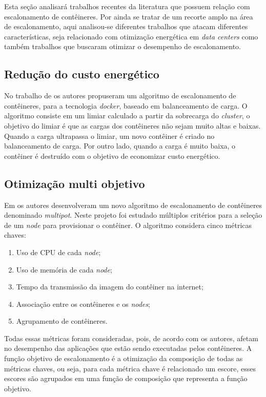 Esta seção analisará trabalhos recentes da literatura que possuem relação com escalonamento de contêineres. Por ainda se tratar de um recorte amplo na área de escalonamento, aqui analisou-se diferentes trabalhos que atacam diferentes características, seja relacionado com otimização energética em \textit{data centers} como também trabalhos que buscaram otimizar o desempenho de escalonamento.

\subsection{Redução do custo energético}
No trabalho de  os autores propuseram um algoritmo de escalonamento de contêineres, para a tecnologia \textit{docker}, baseado em balanceamento de carga. O algoritmo consiste em um limiar calculado a partir da sobrecarga do \textit{cluster}, o objetivo do limiar é que as cargas dos contêineres não sejam muito altas e baixas. Quando a carga ultrapassa o limiar, um novo contêiner é criado no balanceamento de carga. Por outro lado, quando a carga é muito baixa, o contêiner é destruído com o objetivo de economizar custo energético.

\subsection{Otimização multi objetivo}
Em  os autores desenvolveram um novo algoritmo de escalonamento de contêineres denominado \textit{multipot}. Neste projeto foi estudado múltiplos critérios para a seleção de um \textit{node} para provisionar o contêiner. O algoritmo considera cinco métricas chaves:
\begin{enumerate}
	\item Uso de CPU de cada \textit{node};
	\item Uso de memória de cada \textit{node};
	\item Tempo da transmissão da imagem do contêiner na internet;
	\item Associação entre os contêineres e os \textit{nodes};
	\item Agrupamento de contêineres.
\end{enumerate}
Todas essas métricas foram consideradas, pois, de acordo com os autores, afetam no desempenho das aplicações que estão sendo executadas pelos contêineres. A função objetivo de escalonamento é a otimização da composição de todas as métricas chaves, ou seja, para cada métrica chave é relacionado um escore, esses escores são agrupados em uma função de composição que representa a função objetivo.

